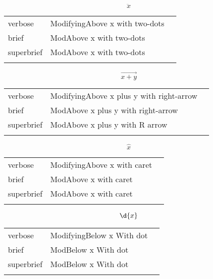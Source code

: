 
\label{sec:modifiers}

\R
\E \[\ddot{x}\]
\begin{longtable}[c]{@{}lll@{}}
\toprule\addlinespace
verbose & ModifyingAbove x with two-dots &

\\\addlinespace
brief & ModAbove x with two-dots &

\\\addlinespace
superbrief & ModAbove x with two-dots &

\\\addlinespace
\bottomrule
\end{longtable}


\E \[\overrightarrow{x+y}\]
\begin{longtable}[c]{@{}lll@{}}
\toprule\addlinespace
verbose & ModifyingAbove x plus y with right-arrow &

\\\addlinespace
brief & ModAbove x plus y with right-arrow &

\\\addlinespace
superbrief & ModAbove x plus y with R arrow &

\\\addlinespace
\bottomrule
\end{longtable}


\E \[\hat{x}\]
\begin{longtable}[c]{@{}lll@{}}
\toprule\addlinespace
verbose & ModifyingAbove x with caret &

\\\addlinespace
brief & ModAbove x with caret &

\\\addlinespace
superbrief & ModAbove x with caret &

\\\addlinespace
\bottomrule
\end{longtable}


\R
\E \[\d{x}\]
\begin{longtable}[c]{@{}lll@{}}
\toprule\addlinespace
verbose & ModifyingBelow x With dot &

\\\addlinespace
brief & ModBelow x With dot &

\\\addlinespace
superbrief & ModBelow x With dot &

\\\addlinespace
\bottomrule
\end{longtable}



